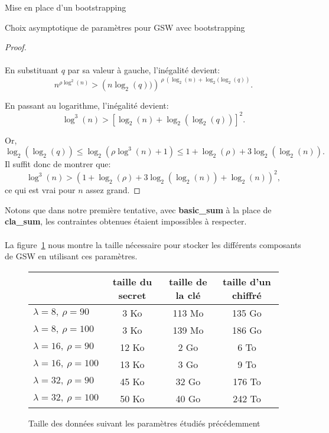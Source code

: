 \begin{section}{Mise en place d'un bootstrapping}
\begin{subsection}{Choix asymptotique de paramètres pour GSW avec bootstrapping}
\begin{proof}
\paragraph{}
En substituant $q$ par sa valeur à gauche, l'inégalité devient:
\begin{equation*}
n^{\rho \log^2(n)} > {\left(n\log_2(q))\right)}^{\:\rho\: \left(\log_2(n) + \log_2(\log_2(q)\right)}.
\end{equation*}

En passant au logarithme, l'inégalité devient:
\[ \log^3(n) > {\left[\log_2(n) + \log_2(\log_2(q))\right]}^2. \]

Or,
\[ \log_2(\log_2(q)) \leqslant \log_2(\rho \log^3(n) + 1) \leqslant 1 + \log_2(\rho) + 3 \log_2(\log_2(n)).\]
Il suffit donc de montrer que:
\[ \log^3(n) > {(1 + \log_2(\rho) + 3\log_2(\log_2(n)) + \log_2(n))}^2,\]
ce qui est vrai pour $n$ assez grand.
\end{proof}
\begin{rmq}
Notons que dans notre première tentative, avec \textbf{basic\_sum} à la place de \textbf{cla\_sum}, 
les contraintes obtenues étaient impossibles à respecter.
\end{rmq}

\paragraph{}
La figure~\ref{size_boostrapping} nous montre la taille nécessaire
pour stocker les différents composants de GSW en utilisant ces paramètres.
\begin{figure}[!ht]
\begin{tabular}{|l|c|c|c|}
\hline
& taille du secret & taille de la clé & taille d'un chiffré \\
\hline
$\lambda = 8, \ \rho = 90$ & 3 Ko & 113 Mo & 135 Go \\
\hline
$\lambda = 8, \ \rho = 100$ & 3 Ko & 139 Mo & 186 Go \\
\hline
$\lambda = 16, \ \rho = 90$ & 12 Ko & 2 Go & 6 To \\
\hline
$\lambda = 16, \ \rho = 100$ & 13 Ko & 3 Go & 9 To \\
\hline
$\lambda = 32, \ \rho = 90$ & 45 Ko & 32 Go & 176 To \\
\hline
$\lambda = 32, \ \rho = 100$ & 50 Ko & 40 Go & 242 To \\
\hline
\end{tabular}
\caption{Taille des données suivant les paramètres étudiés précédemment}
\label{size_boostrapping}
\end{figure}

\end{subsection}
\end{section}
